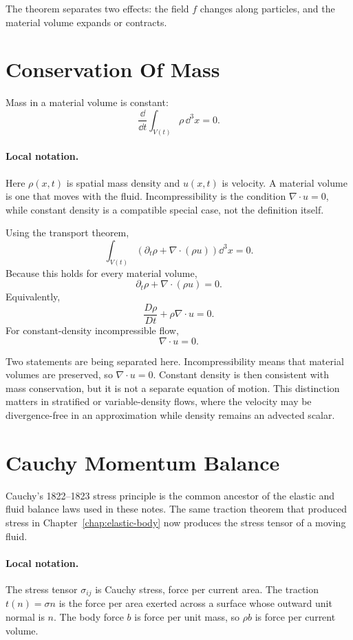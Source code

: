 The theorem separates two effects: the field \(f\) changes along particles, and
the material volume expands or contracts.

\section{Conservation Of Mass}
\label{sec:mass-conservation}

Mass in a material volume is constant:
\[
  \frac{\dd}{\dd t}\int_{V(t)}\rho\,\dd^3x=0.
\]

\paragraph{Local notation.}
Here \(\rho(x,t)\) is spatial mass density and \(u(x,t)\) is velocity.  A
material volume is one that moves with the fluid.  Incompressibility is the
condition \(\nabla\cdot u=0\), while constant density is a compatible special
case, not the definition itself.

Using the transport theorem,
\[
  \int_{V(t)}
  \left(
    \partial_t\rho+\nabla\cdot(\rho u)
  \right)\dd^3x=0.
\]
Because this holds for every material volume,
\[
  \boxed{
  \partial_t\rho+\nabla\cdot(\rho u)=0.
  }
\]
Equivalently,
\[
  \frac{D\rho}{Dt}+\rho\nabla\cdot u=0.
\]
For constant-density incompressible flow,
\[
  \boxed{\nabla\cdot u=0.}
\]

Two statements are being separated here. Incompressibility means that material
volumes are preserved, so \(\nabla\cdot u=0\). Constant density is then
consistent with mass conservation, but it is not a separate equation of
motion. This distinction matters in stratified or variable-density flows, where
the velocity may be divergence-free in an approximation while density remains
an advected scalar.

\section{Cauchy Momentum Balance}
\label{sec:cauchy-momentum}

Cauchy's 1822--1823 stress principle is the common ancestor of the elastic and
fluid balance laws used in these notes. The same traction theorem that produced
stress in Chapter~\ref{chap:elastic-body} now produces the stress tensor of a
moving fluid.

\paragraph{Local notation.}
The stress tensor \(\sigma_{ij}\) is Cauchy stress, force per current area.
The traction \(t(n)=\sigma n\) is the force per area exerted across a surface
whose outward unit normal is \(n\).  The body force \(b\) is force per unit
mass, so \(\rho b\) is force per current volume.

